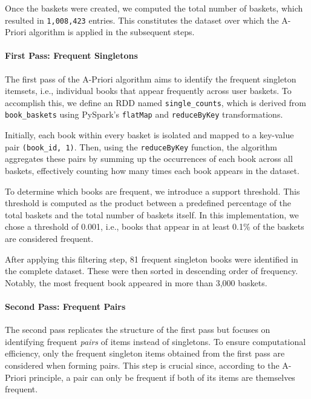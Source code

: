 \documentclass[a4paper,12pt]{article}
\begin{document}
Once the baskets were created, we computed the total number of baskets, which resulted in \texttt{1,008,423} entries. This constitutes the dataset over which the A-Priori algorithm is applied in the subsequent steps.

\paragraph{First Pass: Frequent Singletons}

The first pass of the A-Priori algorithm aims to identify the frequent singleton itemsets, i.e., individual books that appear frequently across user baskets. To accomplish this, we define an RDD named \texttt{single\_counts}, which is derived from \texttt{book\_baskets} using PySpark’s \texttt{flatMap} and \texttt{reduceByKey} transformations.

Initially, each book within every basket is isolated and mapped to a key-value pair \texttt{(book\_id, 1)}. Then, using the \texttt{reduceByKey} function, the algorithm aggregates these pairs by summing up the occurrences of each book across all baskets, effectively counting how many times each book appears in the dataset.

To determine which books are frequent, we introduce a support threshold. This threshold is computed as the product between a predefined percentage of the total baskets and the total number of baskets itself. In this implementation, we chose a threshold of 0.001, i.e., books that appear in at least 0.1\% of the baskets are considered frequent.

After applying this filtering step, 81 frequent singleton books were identified in the complete dataset. These were then sorted in descending order of frequency. Notably, the most frequent book appeared in more than 3,000 baskets.

\paragraph{Second Pass: Frequent Pairs}

The second pass replicates the structure of the first pass but focuses on identifying frequent \textit{pairs} of items instead of singletons. To ensure computational efficiency, only the frequent singleton items obtained from the first pass are considered when forming pairs. This step is crucial since, according to the A-Priori principle, a pair can only be frequent if both of its items are themselves frequent.
\end{document}
